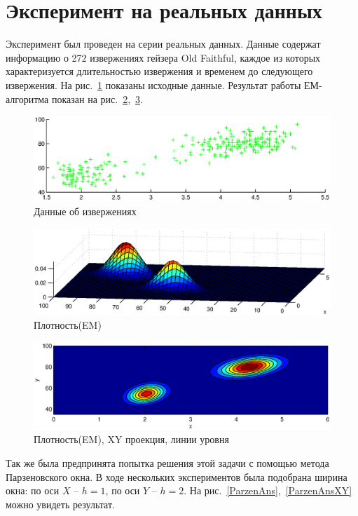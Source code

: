 \documentclass[10pt, a4paper]{article}
\begin{document}
\clearpage
\section{Эксперимент на реальных данных}
Эксперимент был проведен на серии реальных данных. Данные содержат информацию о 272 извержениях гейзера Old Faithful,
каждое из которых характеризуется длительностью извержения и временем до следующего извержения.  
На рис.~\ref{data} показаны исходные данные.
Результат работы ЕМ-алгоритма показан на рис.~\ref{EMans},~\ref{EMansXY}.
\begin{figure}[h]
    \includegraphics[width=\textwidth]{data.eps}
    \caption{Данные об извержениях}
    \label{data}
\end{figure}
\begin{figure}[h]
    \includegraphics[width=\textwidth]{EMans.eps}
    \caption{Плотность(EM)}
    \label{EMans}
\end{figure}
\begin{figure}[h]
    \includegraphics[width=\textwidth]{EMansXY.eps}
    \caption{Плотность(EM), XY проекция, линии уровня}
    \label{EMansXY}
\end{figure}

Так же была предпринята попытка решения этой задачи с помощью метода Парзеновского окна.
В ходе нескольких экспериментов была подобрана ширина окна: по оси $X$ -- $h=1$, по оси $Y$ -- $h=2$.
На рис.~\ref{ParzenAns},~\ref{ParzenAnsXY} можно увидеть результат.
\end{document}
